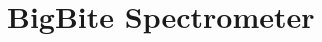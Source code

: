 \part{BigBite Spectrometer}
\graphicspath{{bigbite/figs/}}
\renewcommand{\dirfig}[0]{bigbite/figs}
\renewcommand{\dircur}[0]{bigbite}


%


